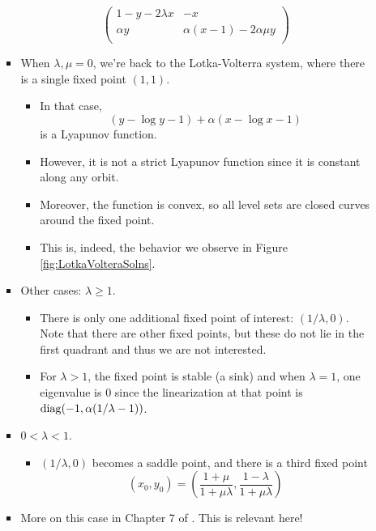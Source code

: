 \documentclass[../notes.tex]{subfiles}
\begin{document}
\begin{itemize}
\begin{itemize}
\begin{itemize}
\begin{equation*}
                \begin{pmatrix}
                    1-y-2\lambda x & -x\\
                    \alpha y & \alpha(x-1)-2\alpha\mu y\\
                \end{pmatrix}
            \end{equation*}
            \item When $\lambda,\mu=0$, we're back to the Lotka-Volterra system, where there is a single fixed point $(1,1)$.
            \begin{itemize}
                \item In that case,
                \begin{equation*}
                    (y-\log y-1)+\alpha(x-\log x-1)
                \end{equation*}
                is a Lyapunov function.
                \item However, it is not a strict Lyapunov function since it is constant along any orbit.
                \item Moreover, the function is convex, so all level sets are closed curves around the fixed point.
                \item This is, indeed, the behavior we observe in Figure \ref{fig:LotkaVolteraSolns}.
            \end{itemize}
            \item Other cases: $\lambda\geq 1$.
            \begin{itemize}
                \item There is only one additional fixed point of interest: $(1/\lambda,0)$. Note that there are other fixed points, but these do not lie in the first quadrant and thus we are not interested.
                \item For $\lambda>1$, the fixed point is stable (a sink) and when $\lambda=1$, one eigenvalue is 0 since the linearization at that point is $\operatorname{diag}(-1,\alpha(1/\lambda-1))$.
            \end{itemize}
            \item $0<\lambda<1$.
            \begin{itemize}
                \item $(1/\lambda,0)$ becomes a saddle point, and there is a third fixed point
                \begin{equation*}
                    (x_0,y_0) = \left( \frac{1+\mu}{1+\mu\lambda},\frac{1-\lambda}{1+\mu\lambda} \right)
                \end{equation*}
            \end{itemize}
            \item More on this case in Chapter 7 of \textcite{bib:Teschl}. This is relevant here!
        \end{itemize}
    \end{itemize}
\end{itemize}
\end{document}
